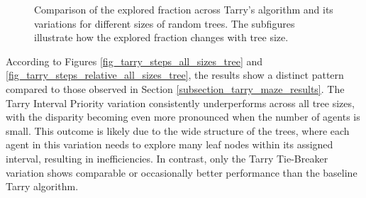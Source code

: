 \begin{figure}[H]
    \centering
    \qquad
    \qquad
    \newline 
    \qquad
    \newline 
    \caption{Comparison of the explored fraction across Tarry's algorithm and its variations for different sizes of random trees. The subfigures illustrate how the explored fraction changes with tree size.} 
    \label{fig_tarry_fraction_all_sizes_tree} 
\end{figure}

According to Figures \ref{fig_tarry_steps_all_sizes_tree} and \ref{fig_tarry_steps_relative_all_sizes_tree}, the results show a distinct pattern compared to those observed in Section \ref{subsection_tarry_maze_results}. The Tarry Interval Priority variation consistently underperforms across all tree sizes, with the disparity becoming even more pronounced when the number of agents is small. This outcome is likely due to the wide structure of the trees, where each agent in this variation needs to explore many leaf nodes within its assigned interval, resulting in inefficiencies. In contrast, only the Tarry Tie-Breaker variation shows comparable or occasionally better performance than the baseline Tarry algorithm.%

